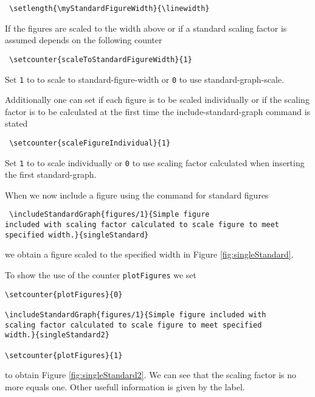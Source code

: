 \documentclass[12pt,a4paper]{article}
\newcommand{\comm}[1]{\texttt{#1}}
\begin{document}
\begin{verbatim} \setlength{\myStandardFigureWidth}{\linewidth} 
\end{verbatim}

If the figures are scaled to the width above or if a standard 
scaling factor is assumed depends on the following counter

\begin{verbatim} \setcounter{scaleToStandardFigureWidth}{1} 
\end{verbatim}

Set \comm{1} to to scale to standard-figure-width or \comm{0} to 
use standard-graph-scale. 

Additionally one can set if each figure is to be scaled 
individually or if the scaling factor is to be calculated at the 
first time the include-standard-graph command is stated

\begin{verbatim} \setcounter{scaleFigureIndividual}{1} 
\end{verbatim} 

Set \comm{1} to to scale individually or \comm{0} to use scaling 
factor calculated when inserting the first standard-graph. 

When we now include a figure using the command for standard 
figures 

\begin{verbatim} \includeStandardGraph{figures/1}{Simple figure 
included with scaling factor calculated to scale figure to meet 
specified width.}{singleStandard} 
\end{verbatim}

we obtain a figure scaled to the specified width in Figure 
\ref{fig:singleStandard}.

To show the use of the counter \comm{plotFigures} we set

\begin{verbatim} 
\setcounter{plotFigures}{0} 

\includeStandardGraph{figures/1}{Simple figure included with 
scaling factor calculated to scale figure to meet specified 
width.}{singleStandard2} 

\setcounter{plotFigures}{1} 
\end{verbatim}

to obtain Figure \ref{fig:singleStandard2}. We can see that the 
scaling factor is no more equals one. Other usefull information 
is given by the label. 

\setcounter{plotFigures}{0} 
\setcounter{plotFigures}{1} 
\end{document}
